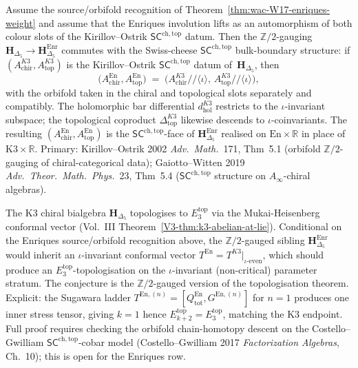 \begin{theorem}
\label{thm:wac-W18-enriques-sc-face}
Assume the source/orbifold recognition of
Theorem~\ref{thm:wac-W17-enriques-weight} and assume that the
Enriques involution lifts as an automorphism of both colour slots of
the Kirillov--Ostrik $\mathsf{SC}^{\mathrm{ch,top}}$ datum. Then the
$\mathbb{Z}/2$-gauging
$\mathbf{H}_{\Delta_5}\to\mathbf{H}_{\Delta_5}^{\mathrm{Enr}}$
commutes with the Swiss-cheese $\mathsf{SC}^{\mathrm{ch,top}}$
bulk-boundary structure: if
$(A^{K3}_{\mathrm{chir}}, A^{K3}_{\mathrm{top}})$
is the Kirillov--Ostrik $\mathsf{SC}^{\mathrm{ch,top}}$ datum
of~$\mathbf{H}_{\Delta_5}$, then
\[
 \bigl(A^{\mathrm{En}}_{\mathrm{chir}}, A^{\mathrm{En}}_{\mathrm{top}}\bigr)
 \;=\;
 \bigl(A^{K3}_{\mathrm{chir}}/\!/\langle\iota\rangle,\,
 A^{K3}_{\mathrm{top}}/\!/\langle\iota\rangle\bigr),
\]
with the orbifold taken in the chiral and topological slots
separately and compatibly. The holomorphic bar differential
$d^{K3}_{\mathrm{hol}}$ restricts to the $\iota$-invariant
subspace; the topological coproduct
$\Delta^{K3}_{\mathrm{top}}$ likewise descends to
$\iota$-coinvariants. The resulting
$(A^{\mathrm{En}}_{\mathrm{chir}}, A^{\mathrm{En}}_{\mathrm{top}})$
is the $\mathsf{SC}^{\mathrm{ch,top}}$-face of
$\mathbf{H}_{\Delta_5}^{\mathrm{Enr}}$ realised on
$\mathrm{En}\times\mathbb{R}$ in place of
$\mathrm{K3}\times\mathbb{R}$. Primary:
Kirillov--Ostrik 2002 \emph{Adv.~Math.}~171, Thm~5.1 (orbifold
$\mathbb{Z}/2$-gauging of chiral-categorical data);
Gaiotto--Witten 2019 \emph{Adv.~Theor.~Math.~Phys.}~23,
Thm~5.4 ($\mathsf{SC}^{\mathrm{ch,top}}$ structure on
$A_\infty$-chiral algebras).
\end{theorem}

\begin{remark}
\label{rem:wac-W18-enriques-topologisation}
The K3 chiral bialgebra $\mathbf{H}_{\Delta_5}$ topologises to
$E_3^{\mathrm{top}}$ via the Mukai-Heisenberg conformal vector
(Vol.~III Theorem~\ref{V3-thm:k3-abelian-at-lie}). Conditional on the Enriques
source/orbifold recognition above, the $\mathbb{Z}/2$-gauged sibling
$\mathbf{H}_{\Delta_5}^{\mathrm{Enr}}$ would inherit an
$\iota$-invariant conformal vector
$T^{\mathrm{En}} = T^{K3}|_{\iota\text{-even}}$, which should
produce an $E_3^{\mathrm{top}}$-topologisation on
the $\iota$-invariant (non-critical) parameter stratum. The
conjecture is the $\mathbb{Z}/2$-gauged version of the topologisation
theorem. Explicit: the Sugawara ladder
$T^{\mathrm{En},(n)} = [Q^{\mathrm{En}}_{\mathrm{tot}}, G^{\mathrm{En},(n)}]$
for $n = 1$ produces one inner stress tensor, giving
$k = 1$ hence $E_{k+2}^{\mathrm{top}} = E_3^{\mathrm{top}}$,
matching the K3 endpoint. Full proof requires checking the
orbifold chain-homotopy descent on the
Costello--Gwilliam $\mathsf{SC}^{\mathrm{ch,top}}$-cobar model
(Costello--Gwilliam 2017 \emph{Factorization Algebras}, Ch.~10);
this is open for the Enriques row.
\end{remark}

